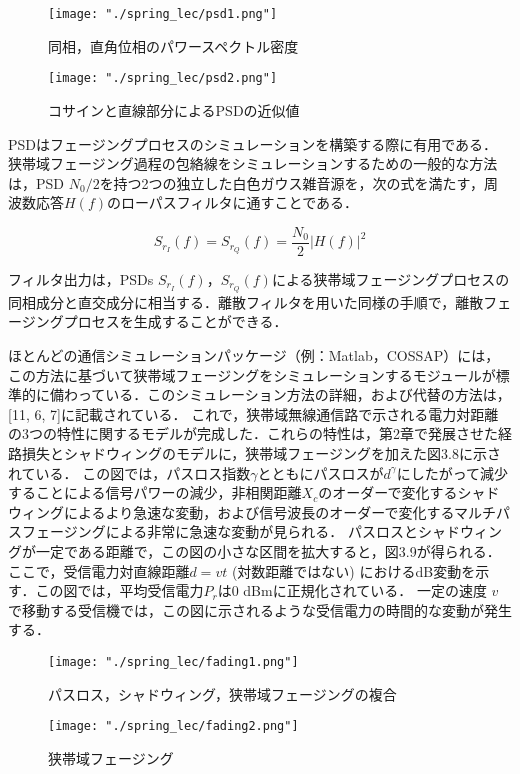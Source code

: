 \documentclass[dvipdfmx]{jsarticle}
\begin{document}
\begin{figure}[H]
\begin{center}
\texttt{[image: "./spring\_lec/psd1.png"]}
\end{center}
\caption{同相，直角位相のパワースペクトル密度}
\end{figure}

\begin{figure}[htbp]
\begin{center}
\texttt{[image: "./spring\_lec/psd2.png"]}
\end{center}
\caption{コサインと直線部分によるPSDの近似値}
\end{figure}

PSDはフェージングプロセスのシミュレーションを構築する際に有用である．
狭帯域フェージング過程の包絡線をシミュレーションするための一般的な方法は，PSD $N_0 / 2$を持つ2つの独立した白色ガウス雑音源を，次の式を満たす，周波数応答$H(f)$のローパスフィルタに通すことである．

\begin{equation}\label{}
S_{r_I}(f) = S_{r_Q}(f) = \frac{N_0}{2} |H(f)|^2
\tag{3.30}
\end{equation}

\noindent
フィルタ出力は，PSDs $S_{r_I}(f)$，$S_{r_Q}(f)$による狭帯域フェージングプロセスの同相成分と直交成分に相当する．離散フィルタを用いた同様の手順で，離散フェージングプロセスを生成することができる．

ほとんどの通信シミュレーションパッケージ（例：Matlab，COSSAP）には，この方法に基づいて狭帯域フェージングをシミュレーションするモジュールが標準的に備わっている．このシミュレーション方法の詳細，および代替の方法は，[11, 6, 7]に記載されている．
これで，狭帯域無線通信路で示される電力対距離の3つの特性に関するモデルが完成した．これらの特性は，第2章で発展させた経路損失とシャドウィングのモデルに，狭帯域フェージングを加えた図3.8に示されている．
この図では，パスロス指数$\gamma$とともにパスロスが$d^{\gamma}$にしたがって減少することによる信号パワーの減少，非相関距離$X_c$のオーダーで変化するシャドウィングによるより急速な変動，および信号波長のオーダーで変化するマルチパスフェージングによる非常に急速な変動が見られる．
パスロスとシャドウィングが一定である距離で，この図の小さな区間を拡大すると，図3.9が得られる．ここで，受信電力対直線距離$d = vt$ (対数距離ではない) におけるdB変動を示す．この図では，平均受信電力$P_r$は0 dBmに正規化されている．
一定の速度 $v$ で移動する受信機では，この図に示されるような受信電力の時間的な変動が発生する．

\begin{figure}[htbp]
\begin{center}
\texttt{[image: "./spring\_lec/fading1.png"]}
\end{center}
\caption{パスロス，シャドウィング，狭帯域フェージングの複合}
\end{figure}

\begin{figure}[htbp]
\begin{center}
\texttt{[image: "./spring\_lec/fading2.png"]}
\end{center}
\caption{狭帯域フェージング}
\end{figure}
\end{document}
